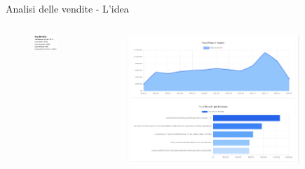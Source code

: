 \documentclass{beamer}
\begin{document}
\begin{frame}{Analisi delle vendite - L'idea}
		\begin{columns}
			\begin{column}{0.33\textwidth}
				\begin{figure}
					\centering
					\includegraphics[width=\textwidth]{Esempio di report delle vendite - Statistiche.png}
				\end{figure}
			\end{column}
			\begin{column}{0.33\textwidth}
				\begin{figure}
					\centering
					\includegraphics[width=\textwidth]{Esempio di report delle vendite - Grafici.png}
				\end{figure}
			\end{column}
			\begin{column}{0.33\textwidth}
				\begin{figure}

\end{figure}
\end{column}
\end{columns}
\end{frame}
\end{document}
